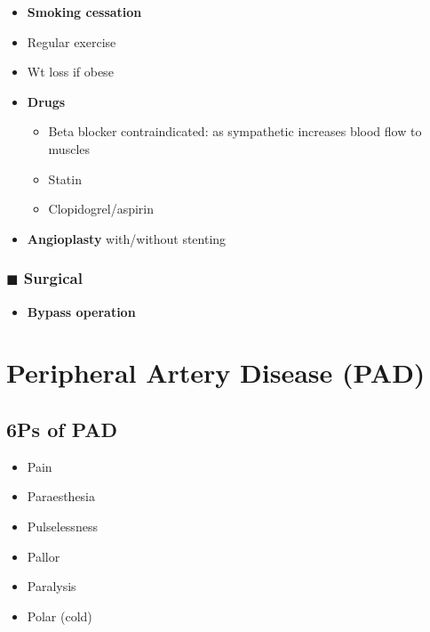 \documentclass[
  12pt,
]{memoir}
\providecommand{\tightlist}{%
  \setlength{\itemsep}{0pt}\setlength{\parskip}{0pt}}
\begin{document}
\begin{itemize}
\tightlist
\item
  \textbf{Smoking cessation}
\item
  Regular exercise
\item
  Wt loss if obese
\item
  \textbf{Drugs}

  \begin{itemize}
  \tightlist
  \item
    Beta blocker contraindicated: as sympathetic increases blood flow to
    muscles
  \item
    Statin
  \item
    Clopidogrel/aspirin
  \end{itemize}
\item
  \textbf{Angioplasty} with/without stenting
\end{itemize}

\hypertarget{blacksquare-surgical}{%
\subsubsection{\texorpdfstring{\(\blacksquare\)
Surgical}{\textbackslash blacksquare Surgical}}\label{blacksquare-surgical}}

\begin{itemize}
\tightlist
\item
  \textbf{Bypass operation}
\end{itemize}

\hypertarget{peripheral-artery-disease-pad}{%
\section{Peripheral Artery Disease
(PAD)}\label{peripheral-artery-disease-pad}}

\hypertarget{ps-of-pad}{%
\subsection{6Ps of PAD}\label{ps-of-pad}}

\begin{itemize}
\tightlist
\item
  Pain
\item
  Paraesthesia
\item
  Pulselessness
\item
  Pallor
\item
  Paralysis
\item
  Polar (cold)
\end{itemize}
\end{document}

